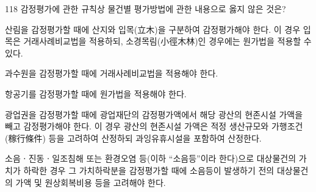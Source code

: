 \begin{question}{118}
감정평가에 관한 규칙상 물건별 평가방법에 관한 내용으로 옳지 않은 것은?
\begin{choices}
  \item 산림을 감정평가할 때에 산지와 입목(立木)을 구분하여 감정평가해야 한다. 이 경우 입목은 거래사례비교법을 적용하되, 소경목림(小徑木林)인 경우에는 원가법을 적용할 수 있다.
  \item 과수원을 감정평가할 때에 거래사례비교법을 적용해야 한다.
  \item 항공기를 감정평가할 때에 원가법을 적용해야 한다.
  \item 광업권을 감정평가할 때에 광업재단의 감정평가액에서 해당 광산의 현존시설 가액을 빼고 감정평가해야 한다. 이 경우 광산의 현존시설 가액은 적정 생산규모와 가행조건(稼行條件) 등을 고려하여 산정하되 과잉유휴시설을 포함하여 산정한다.
  \item 소음ㆍ진동ㆍ일조침해 또는 환경오염 등(이하 “소음등”이라 한다)으로 대상물건의 가치가 하락한 경우 그 가치하락분을 감정평가할 때에 소음등이 발생하기 전의 대상물건의 가액 및 원상회복비용 등을 고려해야 한다.
\end{choices}
\end{question}
